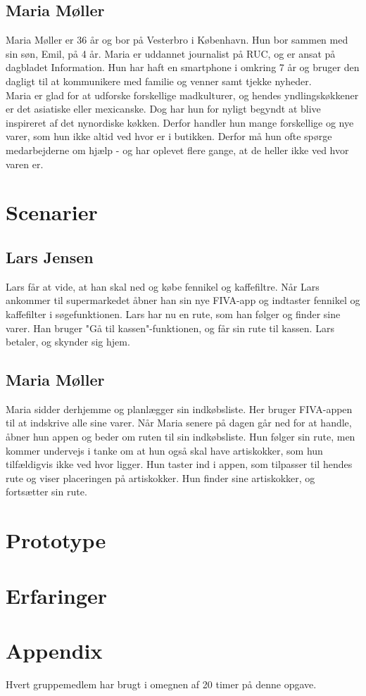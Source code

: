 \documentclass[12pt]{article}
\begin{document}
\subsection{Maria Møller}

\noindent Maria Møller er 36 år og bor på Vesterbro i København. Hun bor sammen med sin søn, Emil, på 4 år. Maria er uddannet journalist på RUC, og er ansat på dagbladet Information. Hun har haft en smartphone i omkring 7 år og bruger den dagligt til at kommunikere med familie og venner samt tjekke nyheder.\\

\noindent Maria er glad for at udforske forskellige madkulturer, og hendes yndlingskøkkener er det asiatiske eller mexicanske. Dog har hun for nyligt begyndt at blive inspireret af det nynordiske køkken. Derfor handler hun mange forskellige og nye varer, som hun ikke altid ved hvor er i butikken. Derfor må hun ofte spørge medarbejderne om hjælp - og har oplevet flere gange, at de heller ikke ved hvor varen er.

\section{Scenarier}

\subsection{Lars Jensen}
Lars får at vide, at han skal ned og købe fennikel og kaffefiltre. Når Lars ankommer til supermarkedet åbner han sin nye FIVA-app og indtaster fennikel og kaffefilter i søgefunktionen. Lars har nu en rute, som han følger og finder sine varer. Han bruger "Gå til kassen"-funktionen, og får sin rute til kassen. Lars betaler, og skynder sig hjem.

\subsection{Maria Møller}
Maria sidder derhjemme og planlægger sin indkøbsliste. Her bruger FIVA-appen til at indskrive alle sine varer. Når Maria senere på dagen går ned for at handle, åbner hun appen og beder om ruten til sin indkøbsliste. Hun følger sin rute, men kommer undervejs i tanke om at hun også skal have artiskokker, som hun tilfældigvis ikke ved hvor ligger. Hun taster ind i appen, som tilpasser til hendes rute og viser placeringen på artiskokker. Hun finder sine artiskokker, og fortsætter sin rute.

\section{Prototype}

\section{Erfaringer}

\section{Appendix}

Hvert gruppemedlem har brugt i omegnen af 20 timer på denne opgave.
\end{document}
